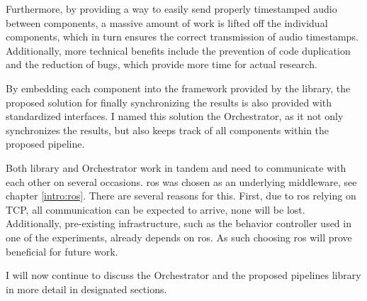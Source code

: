 Furthermore, by providing a way to easily send properly timestamped audio between components, a massive amount of work is lifted off the individual components, which in turn ensures the correct transmission of audio timestamps.
Additionally, more technical benefits include the prevention of code duplication and the reduction of bugs, which provide more time for actual research.

By embedding each component into the framework provided by the library, the proposed solution for finally synchronizing the results is also provided with standardized interfaces.
I named this solution the Orchestrator, as it not only synchronizes the results, but also keeps track of all components within the proposed pipeline.

Both library and Orchestrator work in tandem and need to communicate with each other on several occasions.
\gls{ros} was chosen as an underlying middleware, see chapter \ref{intro:ros}.
There are several reasons for this.
First, due to \gls{ros} relying on TCP, all communication can be expected to arrive, none will be lost.
Additionally, pre-existing infrastructure, such as the behavior controller used in one of the experiments, already depends on \gls{ros}.
As such choosing \gls{ros} will prove beneficial for future work.

I will now continue to discuss the Orchestrator and the proposed pipelines library in more detail in designated sections.



\newpage

\newpage
